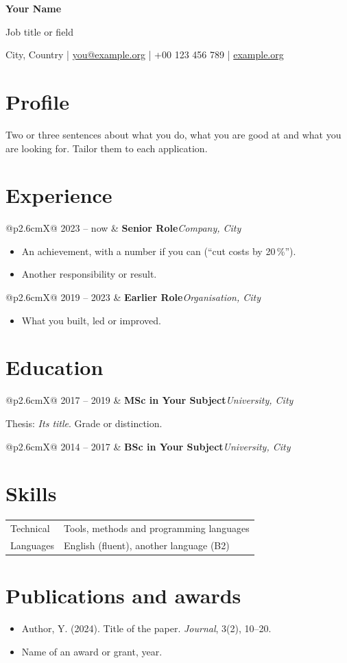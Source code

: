 \documentclass[10pt,a4paper]{article}
\makeatletter
\newcommand{\cventry}[4]{%
  \begin{tabularx}{\linewidth}{@{}p{2.6cm}X@{}}
    \small\color{black!65}#1 & \textbf{#2}\hfill\textit{#3}\par\small #4
  \end{tabularx}\par\vspace{5pt}}
\makeatother
\begin{document}
{\Huge\bfseries Your Name}\par\vspace{4pt}
{\large\color{accent} Job title or field}\par\vspace{6pt}
\small City, Country \quad|\quad
\href{mailto:you@example.org}{you@example.org} \quad|\quad
+00 123 456 789 \quad|\quad
\href{https://example.org}{example.org}
\normalsize

\section{Profile}
Two or three sentences about what you do, what you are good at and what you
are looking for. Tailor them to each application.

\section{Experience}
\cventry{2023 -- now}{Senior Role}{Company, City}{%
  \begin{itemize}
    \item An achievement, with a number if you can (``cut costs by 20\,\%'').
    \item Another responsibility or result.
  \end{itemize}}
\cventry{2019 -- 2023}{Earlier Role}{Organisation, City}{%
  \begin{itemize}
    \item What you built, led or improved.
  \end{itemize}}

\section{Education}
\cventry{2017 -- 2019}{MSc in Your Subject}{University, City}{Thesis: \emph{Its title}. Grade or distinction.}
\cventry{2014 -- 2017}{BSc in Your Subject}{University, City}{}

\section{Skills}
\begin{tabularx}{\linewidth}{@{}p{2.6cm}X@{}}
  \small\color{black!65}Technical & Tools, methods and programming languages \\
  \small\color{black!65}Languages & English (fluent), another language (B2) \\
\end{tabularx}

\section{Publications and awards}
\begin{itemize}
  \item Author, Y. (2024). Title of the paper. \emph{Journal}, 3(2), 10--20.
  \item Name of an award or grant, year.
\end{itemize}
\end{document}
